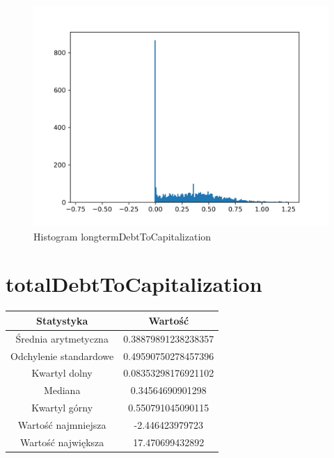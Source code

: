 \documentclass{article}
\begin{document}
\begin{figure}[h!]
    \includegraphics[width=\linewidth]{variables/longtermDebtToCapitalization.png}
    \caption{Histogram longtermDebtToCapitalization }
\end{figure}\section{ totalDebtToCapitalization }

\begin{center}
    \begin{tabular}{|c | c|} 
    \hline
    Statystyka & Wartość \\
    \hline\hline
    Średnia arytmetyczna & 0.38879891238238357 \\ 
    \hline
    Odchylenie standardowe & 0.49590750278457396 \\
    \hline
    Kwartyl dolny & 0.08353298176921102 \\
    \hline
    Mediana & 0.34564690901298 \\
    \hline
    Kwartyl górny & 0.550791045090115 \\
    \hline
    Wartość najmniejsza & -2.446423979723 \\
    \hline
    Wartość największa & 17.470699432892 \\
    \hline
   \end{tabular}
\end{center}
\end{document}

